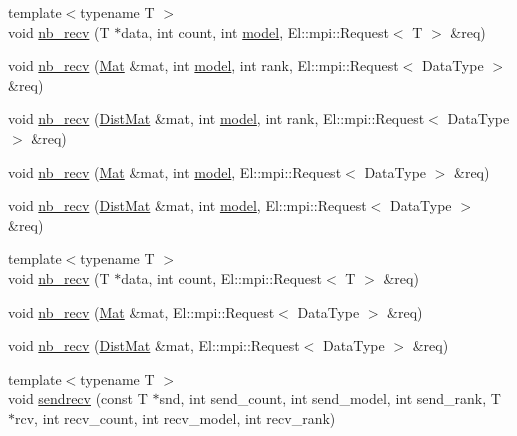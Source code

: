 \begin{DoxyCompactItemize}
\item 
{\footnotesize template$<$typename T $>$ }\\void \hyperlink{classlbann_1_1lbann__comm_ad75e65db156edd86efa26ef1986668d0}{nb\+\_\+recv} (T $\ast$data, int count, int \hyperlink{classlbann_1_1model}{model}, El\+::mpi\+::\+Request$<$ T $>$ \&req)
\item 
void \hyperlink{classlbann_1_1lbann__comm_a8f850662e84e3efab19244d1ef6752d7}{nb\+\_\+recv} (\hyperlink{base_8hpp_a68f11fdc31b62516cb310831bbe54d73}{Mat} \&mat, int \hyperlink{classlbann_1_1model}{model}, int rank, El\+::mpi\+::\+Request$<$ Data\+Type $>$ \&req)
\item 
void \hyperlink{classlbann_1_1lbann__comm_abec714b3f80361f104eaa004d906798b}{nb\+\_\+recv} (\hyperlink{base_8hpp_a0fab5387556805cfeac3e7e567bf66c5}{Dist\+Mat} \&mat, int \hyperlink{classlbann_1_1model}{model}, int rank, El\+::mpi\+::\+Request$<$ Data\+Type $>$ \&req)
\item 
void \hyperlink{classlbann_1_1lbann__comm_ad76ddffcad6e996b8da2ba7670d20b24}{nb\+\_\+recv} (\hyperlink{base_8hpp_a68f11fdc31b62516cb310831bbe54d73}{Mat} \&mat, int \hyperlink{classlbann_1_1model}{model}, El\+::mpi\+::\+Request$<$ Data\+Type $>$ \&req)
\item 
void \hyperlink{classlbann_1_1lbann__comm_aec876be95ab91bfff6337f06adc6a797}{nb\+\_\+recv} (\hyperlink{base_8hpp_a0fab5387556805cfeac3e7e567bf66c5}{Dist\+Mat} \&mat, int \hyperlink{classlbann_1_1model}{model}, El\+::mpi\+::\+Request$<$ Data\+Type $>$ \&req)
\item 
{\footnotesize template$<$typename T $>$ }\\void \hyperlink{classlbann_1_1lbann__comm_a77c74bcc60e9946d45cf575234a7acc2}{nb\+\_\+recv} (T $\ast$data, int count, El\+::mpi\+::\+Request$<$ T $>$ \&req)
\item 
void \hyperlink{classlbann_1_1lbann__comm_a4e703fa356dd7807fda82d1d1eb81e1d}{nb\+\_\+recv} (\hyperlink{base_8hpp_a68f11fdc31b62516cb310831bbe54d73}{Mat} \&mat, El\+::mpi\+::\+Request$<$ Data\+Type $>$ \&req)
\item 
void \hyperlink{classlbann_1_1lbann__comm_a105c0fa7997f23637cbd03d566748bca}{nb\+\_\+recv} (\hyperlink{base_8hpp_a0fab5387556805cfeac3e7e567bf66c5}{Dist\+Mat} \&mat, El\+::mpi\+::\+Request$<$ Data\+Type $>$ \&req)
\item 
{\footnotesize template$<$typename T $>$ }\\void \hyperlink{classlbann_1_1lbann__comm_a6314e3b07b21b8fb0cd2ebe1e49dddb9}{sendrecv} (const T $\ast$snd, int send\+\_\+count, int send\+\_\+model, int send\+\_\+rank, T $\ast$rcv, int recv\+\_\+count, int recv\+\_\+model, int recv\+\_\+rank)

\end{DoxyCompactItemize}
